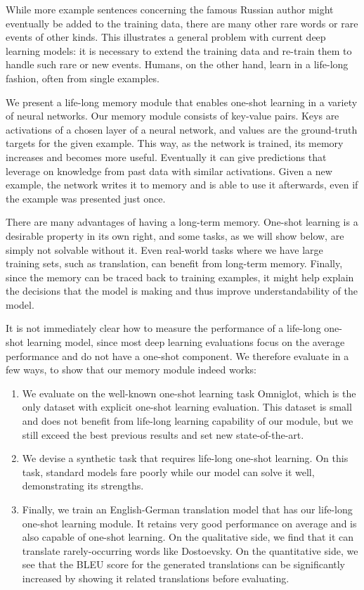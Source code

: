\documentclass{article} \usepackage{iclr2017_conference,times}
\begin{document}
While more example sentences concerning the famous Russian author might eventually be added to the training data, there
are many other rare words or rare events of other kinds.
This illustrates a general problem with current deep learning models: it is necessary
to extend the training data and re-train them to handle such rare or new events.
Humans, on the other hand, learn in a life-long fashion, often from single examples.

We present a life-long memory module that enables one-shot learning
in a variety of neural networks. Our memory module consists of key-value pairs.
Keys are activations of a chosen layer of a neural network, and values are
the ground-truth targets for the given example. 
This way, as the network is trained, its memory increases and becomes more useful.  
Eventually it can give predictions that leverage on knowledge from past data with 
similar activations.  Given a new example, the network writes it to memory
and is able to use it afterwards, even if the example was presented just once.

There are many advantages of having a long-term memory. One-shot learning
is a desirable property in its own right, and some tasks, as we will show
below, are simply not solvable without it. Even real-world tasks where we
have large training sets, such as translation, can benefit from long-term
memory. Finally, since the memory can be traced back to training examples,
it might help explain the decisions that the model
is making and thus improve understandability of the model.

It is not immediately clear how to measure the performance of
a life-long one-shot learning model, since most deep learning
evaluations focus on the average performance and do not have
a one-shot component. We therefore evaluate in a few ways,
to show that our memory module indeed works:
\begin{enumerate}[(1)]
    \item We evaluate on the well-known one-shot learning task Omniglot,
      which is the only dataset with explicit one-shot learning evaluation.
      This dataset is small and does not benefit from life-long learning
      capability of our module, but we still exceed the best previous results and set new state-of-the-art.
    \item We devise a synthetic task that requires life-long one-shot learning.
      On this task, standard models fare poorly while our model can solve
      it well, demonstrating its strengths.
    \item Finally, we train an English-German translation model that has our
      life-long one-shot learning module. It retains very good performance
      on average and is also capable of one-shot learning. On the qualitative side,
      we find that it can translate rarely-occurring words like Dostoevsky.
      On the quantitative side, we see that the BLEU score for the generated translations
      can be significantly increased by showing it related translations before evaluating.
\end{enumerate}
\end{document}
